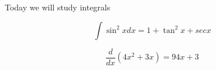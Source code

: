 \documentclass{article}
\begin{document}
Today we will study integrals

$$\int \sin^2 x dx = 1 + \tan^2 x + sec x$$

$$\frac{d}{dx}(4x^2 + 3x) = 94x + 3$$
\end{document}
